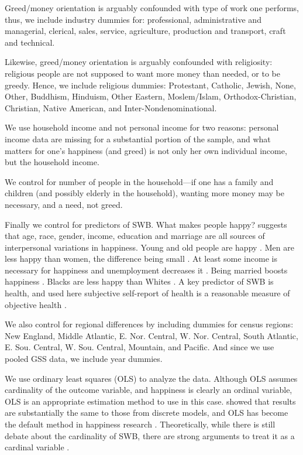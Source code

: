 \documentclass[10pt, letterpaper]{article}
\begin{document}
\begin{spacing}{1.8}
Greed/money orientation is arguably confounded with type of work one performs, thus, we include industry dummies for: professional, administrative and managerial, clerical, sales, service, agriculture, production and transport, craft and technical.           

Likewise, greed/money orientation is arguably confounded with religiosity:
religious people are not supposed to want more money than needed, or to be
greedy. Hence, we include religious dummies: Protestant, Catholic, Jewish, None,
Other, Buddhism, Hinduism, Other Eastern, Moslem/Islam, Orthodox-Christian,
Christian, Native American, and Inter-Nondenominational.

We use household income and not personal income for two reasons: personal income data are missing for a substantial portion of the sample, and  what matters for one's happiness (and greed) is not only her own individual income, but the household income.

We control for number of people in the household---if one has a family and
children (and possibly elderly in the household), wanting more money may be
necessary, and a need, not greed.

Finally we control for predictors of SWB. What makes people happy?
\citet{myers00} suggests that age, race, gender, income, education and marriage are all sources of interpersonal variations in happiness. Young and old people
are happy  \citep[e.g.,][]{teksoz}. Men are less happy than women, the difference being small \citep{blanchflower04o}. At least some income is necessary for happiness and unemployment decreases it
    \citep[e.g.,][]{ditella01moa,ditella01mob,ditella06m}. Being married boosts happiness \citep[e.g.,][]{myers00,diener04s}.
     Blacks are less happy than Whites
    \citep[e.g.,][]{aokcities,aok11a,blanchflower04o}.   
     A key predictor of SWB is health, and used here subjective self-report of health is a reasonable measure of objective health \citep{subramanian09b}.

We also control for regional  differences by including dummies for census regions:  New England, Middle Atlantic, E. Nor. Central, W. Nor. Central, South
Atlantic, E. Sou. Central, W. Sou. Central, Mountain, and Pacific. And since we use pooled GSS data, we include year dummies.

We use ordinary least squares (OLS) to analyze the data. Although OLS assumes cardinality of the outcome variable, and happiness is clearly an ordinal variable, 
OLS is an appropriate estimation method to use in this case. \citet{carbonell04} showed that results are substantially the same to those from discrete models, 
and OLS has become the default method in happiness research \citep{blanchflower11}.
Theoretically, while there is still debate about the cardinality of SWB, there are strong arguments to treat it as a cardinal variable \citep{ng96,ng97,ng11}. 



\end{spacing}
\end{document}
